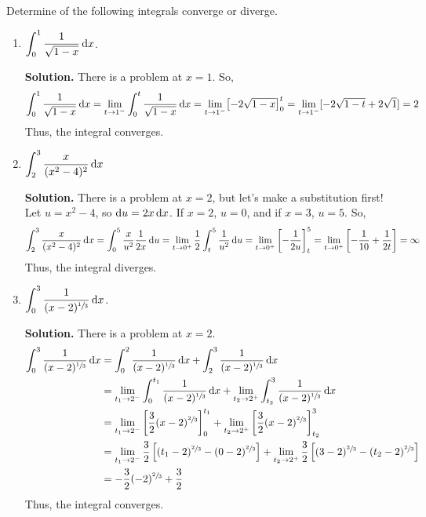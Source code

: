 \begin{Example}{}{}
    Determine of the following integrals converge or diverge.
    \begin{enumerate}[label=(\roman*)]
        \item $ \displaystyle \int_{0}^{1} \frac{1}{\sqrt{1-x}} \odif{x} $.

              \textbf{Solution.} There is a problem at $ x=1 $. So,
              \[ \int_{0}^{1} \frac{1}{\sqrt{1-x}} \odif{x}
                  =\lim\limits_{{t} \to {1^-}} \int_{0}^{t} \frac{1}{\sqrt{1-x}} \odif{x}
                  =\lim\limits_{{t} \to {1^-}}\bigl[-2\sqrt{1-x}\bigr]_0^t
                  =\lim\limits_{{t} \to {1^-}}[-2\sqrt{1-t}+2\sqrt{1}]
                  =2
              \]
              Thus, the integral converges.
        \item $ \displaystyle \int_{2}^{3} \frac{x}{(x^2-4)^2}\odif{x}  $

              \textbf{Solution.} There is a problem at $ x=2 $,
              but let's make a substitution first! Let $ u=x^2-4 $, so $ \odif{u}=2x\odif{x} $. If $ x=2 $,
              $ u=0 $, and if $ x=3 $, $ u=5 $. So,
              \[ \int_{2}^{3} \frac{x}{(x^2-4)^2}\odif{x}
                  =\int_{0}^{5} \frac{x}{u^2} \frac{1}{2x} \odif{u}
                  =\lim\limits_{{t} \to {0^+}} \frac{1}{2} \int_{t}^{5} \frac{1}{u^2}\odif{u}
                  =\lim\limits_{{t} \to {0^+}}\left[-\frac{1}{2u} \right]_t^5
                  =\lim\limits_{{t} \to {0^+}}\left[ -\frac{1}{10} +\frac{1}{2t} \right]
                  =\infty
              \]
              Thus, the integral diverges.
        \item $ \displaystyle \int_{0}^{3} \frac{1}{(x-2)^{\sfrac{1}{3} }}\odif{x}  $.

              \textbf{Solution.} There is a problem at $ x=2 $.
              \begin{align*}
                  \int_{0}^{3} \frac{1}{(x-2)^{\sfrac{1}{3} }}\odif{x}
                   & =\int_{0}^{2} \frac{1}{(x-2)^{\sfrac{1}{3}}} \odif{x}+\int_{2}^{3} \frac{1}{(x-2)^{\sfrac{1}{3} }} \odif{x} \\
                   & =\lim\limits_{{t_1} \to {2^-}} \int_{0}^{t_1} \frac{1}{(x-2)^{\sfrac{1}{3}}}  \odif{x} +
                  \lim\limits_{{t_2} \to {2^+}} \int_{t_2}^{3} \frac{1}{(x-2)^{\sfrac{1}{3}}} \odif{x}                           \\
                   & =\lim\limits_{{t_1} \to {2^-}} \left[ \frac{3}{2}(x-2)^{\sfrac{2}{3}}\right]_0^{t_1}+
                  \lim\limits_{{t_2} \to {2^+}}\left[ \frac{3}{2}(x-2)^{\sfrac{2}{3}}\right]_{t_2}^{3}                           \\
                   & =\lim\limits_{{t_1} \to {2^-}} \frac{3}{2} \left[ (t_1-2)^{\sfrac{2}{3}} -(0-2)^{\sfrac{2}{3}}\right]
                  +\lim\limits_{{t_2} \to {2^+}} \frac{3}{2} \left[ (3-2)^{\sfrac{2}{3}}-(t_2-2)^{\sfrac{2}{3}} \right]          \\
                   & =-\frac{3}{2} (-2)^{\sfrac{2}{3}}+\frac{3}{2}
              \end{align*}
              Thus, the integral converges.
    \end{enumerate}
\end{Example}

